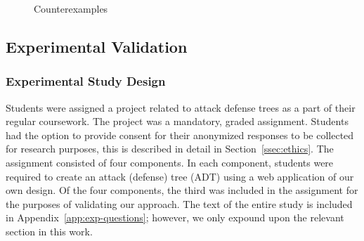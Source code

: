 \begin{figure}
\begin{subfigure}[b]{0.45\linewidth}
        \centering
        \resizebox{2cm}{!}{
            
        }
        \label{fig:b}
    \end{subfigure}
    \begin{subfigure}[b]{0.45\linewidth}
        \centering
        \resizebox{2cm}{!}{
            
        }
        \label{fig:b}
    \end{subfigure}
    \begin{subfigure}[b]{0.45\linewidth}
        \centering
        \resizebox{2cm}{!}{
            
        }
        \label{fig:b}
    \end{subfigure}
    \begin{subfigure}[b]{0.45\linewidth}
        \centering
        \resizebox{2cm}{!}{
            
        }
        \label{fig:b}
    \end{subfigure}
    \begin{subfigure}[b]{0.45\linewidth}
        \centering
        \resizebox{1.8cm}{!}{
            
        }
        \label{fig:b}
    \end{subfigure}
    \caption{Counterexamples}\label{fig:counterexamples}
\end{figure}





\subsection{Experimental Validation}

\subsubsection{Experimental Study Design}
\label{ssec:method-study-design}

Students were assigned a project related to attack defense trees as a part of their regular coursework. The project was a mandatory, graded assignment. Students had the option to provide consent for their anonymized responses to be collected for research purposes, this is described in detail in Section~\ref{ssec:ethics}. The assignment consisted of four components. In each component, students were required to create an attack (defense) tree (ADT) using a web application of our own design. Of the four components, the third was included in the assignment for the purposes of validating our approach. The text of the entire study is included in Appendix~\ref{app:exp-questions}; however, we only expound upon the relevant section in this work.

